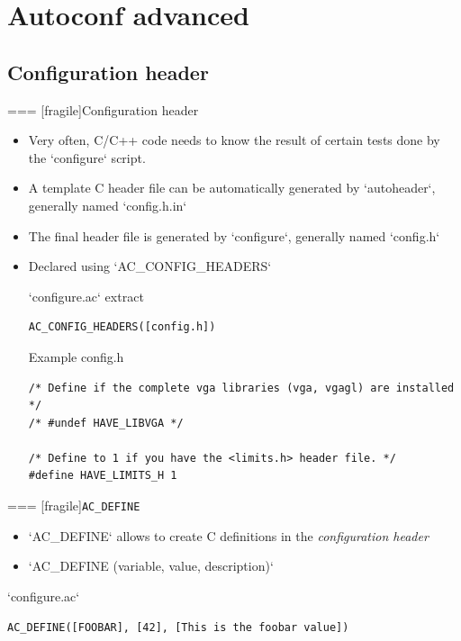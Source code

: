 
\section{Autoconf advanced}

\subsection{Configuration header}

=== [fragile]{Configuration header}
  \begin{itemize}
  \item Very often, C/C++ code needs to know the result of certain
    tests done by the `configure` script.
  \item A template C header file can be automatically generated by
    `autoheader`, generally named `config.h.in`
  \item The final header file is generated by `configure`,
    generally named `config.h`
  \item Declared using `AC_CONFIG_HEADERS`
    \begin{block}{`configure.ac` extract}
\begin{verbatim}
AC_CONFIG_HEADERS([config.h])
\end{verbatim}
    \end{block}

    \begin{block}{Example config.h}
\begin{verbatim}
/* Define if the complete vga libraries (vga, vgagl) are installed */
/* #undef HAVE_LIBVGA */

/* Define to 1 if you have the <limits.h> header file. */
#define HAVE_LIMITS_H 1
\end{verbatim}
\end{block}
  \end{itemize}


=== [fragile]{{\tt AC\_DEFINE}}

  \begin{itemize}
  \item `AC_DEFINE` allows to create C definitions in the {\em
      configuration header}
  \item `AC_DEFINE (variable, value, description)`
  \end{itemize}

  \begin{block}{`configure.ac`}
\begin{verbatim}
AC_DEFINE([FOOBAR], [42], [This is the foobar value])
\end{verbatim}
  \end{block}

